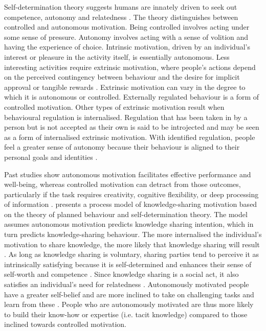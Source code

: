 Self-determination theory suggests humans are innately driven to seek out competence, autonomy and relatedness \citep{ryan2000self}. The theory distinguishes between controlled and autonomous motivation. Being controlled involves acting under some sense of pressure. Autonomy involves acting with a sense of volition and having the experience of choice. Intrinsic motivation, driven by an individual’s interest or pleasure in the activity itself, is essentially autonomous. Less interesting activities require extrinsic motivation, where people's actions depend on the perceived contingency between behaviour and the desire for implicit approval or tangible rewards \citep{gagne2005self}. Extrinsic motivation can vary in the degree to which it is autonomous or controlled. Externally regulated behaviour is a form of controlled motivation. Other types of extrinsic motivation result when behavioural regulation is internalised. Regulation that has been taken in by a person but is not accepted as their own is said to be introjected and may be seen as a form of internalised extrinsic motivation. With identified regulation, people feel a greater sense of autonomy because their behaviour is aligned to their personal goals and identities \citep{gagne2005self}. \medskip

Past studies show autonomous motivation facilitates effective performance and well-being, whereas controlled motivation can detract from those outcomes, particularly if the task requires creativity, cognitive flexibility, or deep processing of information \citep{gagne2005self}. \citet{gagne2009model} presents a process model of knowledge-sharing motivation based on the theory of planned behaviour and self-determination theory. The model assumes autonomous motivation predicts knowledge sharing intention, which in turn predicts knowledge-sharing behaviour. The more internalised the individual’s motivation to share knowledge, the more likely that knowledge sharing will result \citep{gagne2009model,witherspoon2013antecedents}. As long as knowledge sharing is voluntary, sharing parties tend to perceive it as intrinsically satisfying because it is self-determined and enhances their sense of self-worth and competence \citep{kaser2001knowledge,lam2010knowledge,dumbach2014establishing}. Since knowledge sharing is a social act, it also satisfies an individual's need for relatedness \citep{llopis2016understanding}. Autonomously motivated people have a greater self-belief and are more inclined to take on challenging tasks and learn from these \citep{bandura1977self}. People who are autonomously motivated are thus more likely to build their know-how or expertise (i.e. tacit knowledge) compared to those inclined towards controlled motivation. \medskip

